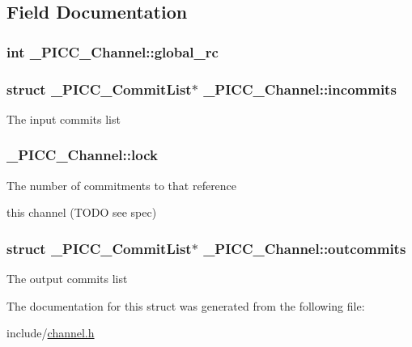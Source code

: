 \subsection{Field Documentation}
\hypertarget{struct__PICC__Channel_a2a19db7029a1bf3b7d28e74bac691b09}{
\subsubsection[{global\-\_\-rc}]{\setlength{\rightskip}{0pt plus 5cm}int \-\_\-\-P\-I\-C\-C\-\_\-\-Channel\-::global\-\_\-rc}}\label{struct__PICC__Channel_a2a19db7029a1bf3b7d28e74bac691b09}
\hypertarget{struct__PICC__Channel_ad6f44f3feb22c8bb8390cd6663209db8}{
\subsubsection[{incommits}]{\setlength{\rightskip}{0pt plus 5cm}struct {\bf \-\_\-\-P\-I\-C\-C\-\_\-\-Commit\-List}$\ast$ \-\_\-\-P\-I\-C\-C\-\_\-\-Channel\-::incommits}}\label{struct__PICC__Channel_ad6f44f3feb22c8bb8390cd6663209db8}
The input commits list \hypertarget{struct__PICC__Channel_a3d02581ff833cb6224c88d4657fb2c50}{
\subsubsection[{lock}]{ \-\_\-\-P\-I\-C\-C\-\_\-\-Channel\-::lock}}\label{struct__PICC__Channel_a3d02581ff833cb6224c88d4657fb2c50}
The number of commitments to that reference

this channel (T\-O\-D\-O see spec) \hypertarget{struct__PICC__Channel_a1015ce4e3d56e74b0b5cf157df50c319}{
\subsubsection[{outcommits}]{\setlength{\rightskip}{0pt plus 5cm}struct {\bf \-\_\-\-P\-I\-C\-C\-\_\-\-Commit\-List}$\ast$ \-\_\-\-P\-I\-C\-C\-\_\-\-Channel\-::outcommits}}\label{struct__PICC__Channel_a1015ce4e3d56e74b0b5cf157df50c319}
The output commits list 

The documentation for this struct was generated from the following file\-:\begin{DoxyCompactItemize}
\item 
include/\hyperlink{channel_8h}{channel.\-h}\end{DoxyCompactItemize}
